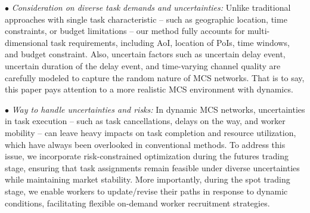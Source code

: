 \noindent $\bullet$ \textit{Consideration on diverse task demands and uncertainties:} Unlike traditional approaches with single task characteristic -- such as geographic location, time constraints, or budget limitations -- our method fully accounts for multi-dimensional task requirements, including AoI, location of PoIs, time windows, and budget constraint. Also, uncertain factors such as uncertain delay event, uncertain duration of the delay event, and time-varying channel quality are carefully modeled to capture the random nature of MCS networks. That is to say, this paper pays attention to a more realistic MCS environment with dynamics.

\noindent $\bullet$ \textit{Way to handle uncertainties and risks:} In dynamic MCS networks, uncertainties in task execution -- such as task cancellations, delays on the way, and worker mobility -- can leave heavy impacts on task completion and resource utilization, which have always been overlooked in conventional methods. To address this issue, we incorporate risk-constrained optimization during the futures trading stage, ensuring that task assignments remain feasible under diverse uncertainties while maintaining market stability. More importantly, during the spot trading stage, we enable workers to update/revise their paths in response to dynamic conditions, facilitating flexible on-demand worker recruitment strategies.